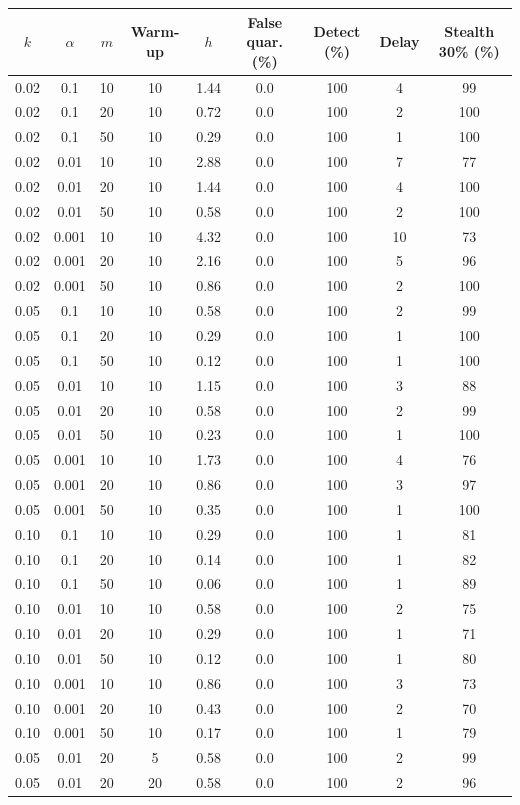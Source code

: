 \begin{tabular}{ccccccccc}
\toprule
$k$ & $\alpha$ & $m$ & Warm-up & $h$ & False quar. (\%) & Detect (\%) & Delay & Stealth 30\% (\%) \\
\midrule
0.02 & 0.1 & 10 & 10 & 1.44 & 0.0 & 100 & 4 & 99 \\
0.02 & 0.1 & 20 & 10 & 0.72 & 0.0 & 100 & 2 & 100 \\
0.02 & 0.1 & 50 & 10 & 0.29 & 0.0 & 100 & 1 & 100 \\
0.02 & 0.01 & 10 & 10 & 2.88 & 0.0 & 100 & 7 & 77 \\
0.02 & 0.01 & 20 & 10 & 1.44 & 0.0 & 100 & 4 & 100 \\
0.02 & 0.01 & 50 & 10 & 0.58 & 0.0 & 100 & 2 & 100 \\
0.02 & 0.001 & 10 & 10 & 4.32 & 0.0 & 100 & 10 & 73 \\
0.02 & 0.001 & 20 & 10 & 2.16 & 0.0 & 100 & 5 & 96 \\
0.02 & 0.001 & 50 & 10 & 0.86 & 0.0 & 100 & 2 & 100 \\
0.05 & 0.1 & 10 & 10 & 0.58 & 0.0 & 100 & 2 & 99 \\
0.05 & 0.1 & 20 & 10 & 0.29 & 0.0 & 100 & 1 & 100 \\
0.05 & 0.1 & 50 & 10 & 0.12 & 0.0 & 100 & 1 & 100 \\
0.05 & 0.01 & 10 & 10 & 1.15 & 0.0 & 100 & 3 & 88 \\
0.05 & 0.01 & 20 & 10 & 0.58 & 0.0 & 100 & 2 & 99 \\
0.05 & 0.01 & 50 & 10 & 0.23 & 0.0 & 100 & 1 & 100 \\
0.05 & 0.001 & 10 & 10 & 1.73 & 0.0 & 100 & 4 & 76 \\
0.05 & 0.001 & 20 & 10 & 0.86 & 0.0 & 100 & 3 & 97 \\
0.05 & 0.001 & 50 & 10 & 0.35 & 0.0 & 100 & 1 & 100 \\
0.10 & 0.1 & 10 & 10 & 0.29 & 0.0 & 100 & 1 & 81 \\
0.10 & 0.1 & 20 & 10 & 0.14 & 0.0 & 100 & 1 & 82 \\
0.10 & 0.1 & 50 & 10 & 0.06 & 0.0 & 100 & 1 & 89 \\
0.10 & 0.01 & 10 & 10 & 0.58 & 0.0 & 100 & 2 & 75 \\
0.10 & 0.01 & 20 & 10 & 0.29 & 0.0 & 100 & 1 & 71 \\
0.10 & 0.01 & 50 & 10 & 0.12 & 0.0 & 100 & 1 & 80 \\
0.10 & 0.001 & 10 & 10 & 0.86 & 0.0 & 100 & 3 & 73 \\
0.10 & 0.001 & 20 & 10 & 0.43 & 0.0 & 100 & 2 & 70 \\
0.10 & 0.001 & 50 & 10 & 0.17 & 0.0 & 100 & 1 & 79 \\
0.05 & 0.01 & 20 & 5 & 0.58 & 0.0 & 100 & 2 & 99 \\
0.05 & 0.01 & 20 & 20 & 0.58 & 0.0 & 100 & 2 & 96 \\
\bottomrule
\end{tabular}

